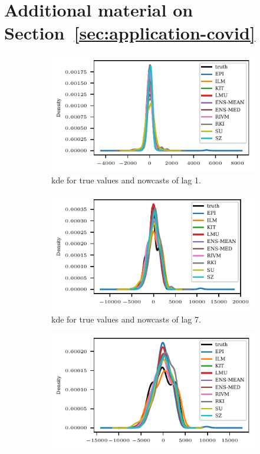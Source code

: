 \section{Additional material on Section~\ref{sec:application-covid}}\label{sec:appendix-application-covid}


\begin{figure}
    \centering
    \begin{subfigure}[t]{.48\textwidth}
        \includegraphics{plots/covid_nowcast/20_kde_lag_1}
        \caption{\ac{kde} for true values and nowcasts of lag 1.}
    \end{subfigure}\hspace{0.01\textwidth}
    \begin{subfigure}[t]{.48\textwidth}
        \includegraphics{plots/covid_nowcast/20_kde_lag_7}
        \caption{\ac{kde} for true values and nowcasts of lag 7.}
    \end{subfigure}\hspace{0.01\textwidth}
    \begin{subfigure}[t]{.48\textwidth}
        \includegraphics{plots/covid_nowcast/20_kde_lag_14}

\end{subfigure}
\end{figure}
